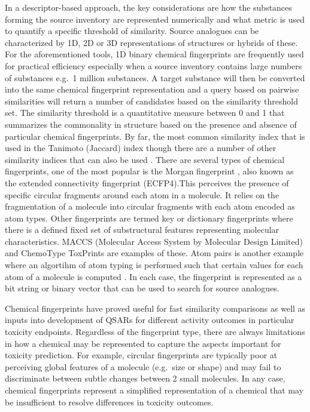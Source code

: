 \documentclass[
  super,
  preprint,
  3p]{elsarticle}
\begin{document}
In a descriptor-based approach, the key considerations are how the
substances forming the source inventory are represented numerically and
what metric is used to quantify a specific threshold of similarity.
Source analogues can be characterized by 1D, 2D or 3D representations of
structures or hybrids of these. For the aforementioned tools, 1D binary
chemical fingerprints are frequently used for practical efficiency
especially when a source inventory contains large numbers of substances
e.g.~1 million substances. A target substance will then be converted
into the same chemical fingerprint representation and a query based on
pairwise similarities will return a number of candidates based on the
similarity threshold set. The similarity threshold is a quantitative
measure between 0 and 1 that summarizes the commonality in structure
based on the presence and absence of particular chemical fingerprints.
By far, the most common similarity index that is used in the Tanimoto
(Jaccard) index \citep{bajusz_why_2015} though there are a number of
other similarity indices that can also be used
\citep{bajusz_why_2015, floris_generalizable_2014}. There are several
types of chemical fingerprints, one of the most popular is the Morgan
fingerprint \citep{rogers_extended-connectivity_2010}, also known as the
extended connectivity fingerprint (ECFP4).This perceives the presence of
specific circular fragments around each atom in a molecule. It relies on
the fragmentation of a molecule into circular fragments with each atom
encoded as atom types. Other fingerprints are termed key or dictionary
fingerprints where there is a defined fixed set of substructural
features representing molecular characteristics. MACCS (Molecular Access
System by Molecular Design Limited) \citep{durant_reoptimization_2002}
and ChemoType ToxPrints \citep{yang_new_2015} are examples of these.
Atom pairs is another example where an algortihm of atom typing is
performed such that certain values for each atom of a molecule is
computed \citep{carhart_atom_1985}. In each case, the fingerprint is
represented as a bit string or binary vector that can be used to search
for source analogues.

Chemical fingerprints have proved useful for fast similarity comparisons
as well as inputs into development of QSARs for different activity
outcomes in particular toxicity endpoints. Regardless of the fingerprint
type, there are always limitations in how a chemical may be represented
to capture the aspects important for toxicity prediction. For example,
circular fingerprints are typically poor at perceiving global features
of a molecule (e.g.~size or shape) and may fail to discriminate between
subtle changes between 2 small molecules. In any case, chemical
fingerprints represent a simplified representation of a chemical that
may be insufficient to resolve differences in toxicity outcomes.
\end{document}
